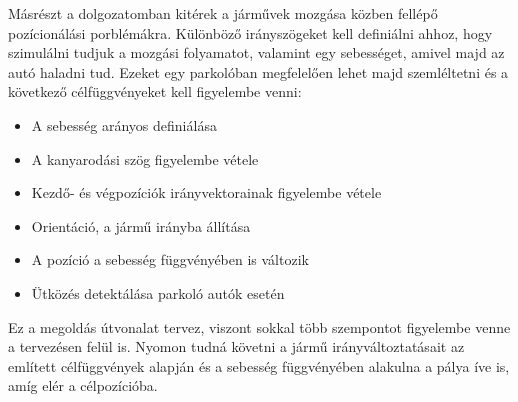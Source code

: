 
Másrészt a dolgozatomban kitérek a járművek mozgása közben fellépő pozícionálási porblémákra. Különböző irányszögeket kell definiálni ahhoz, hogy szimulálni tudjuk a mozgási folyamatot, valamint egy sebességet, amivel majd az autó haladni tud. Ezeket egy parkolóban megfelelően lehet majd szemléltetni és a következő célfüggvényeket kell figyelembe venni:
\begin{itemize}
	\item A sebesség arányos definiálása
	\item A kanyarodási szög figyelembe vétele
	\item Kezdő- és végpozíciók irányvektorainak figyelembe vétele
	\item Orientáció, a jármű irányba állítása
	\item A pozíció a sebesség függvényében is változik
	\item Ütközés detektálása parkoló autók esetén
\end{itemize}

Ez a megoldás útvonalat tervez, viszont sokkal több szempontot figyelembe venne a tervezésen felül is. Nyomon tudná követni a jármű irányváltoztatásait az említett célfüggvények alapján és a sebesség függvényében alakulna a pálya íve is, amíg elér a célpozícióba.




